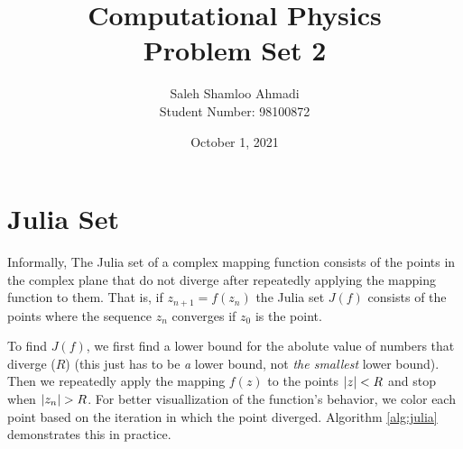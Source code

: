 \documentclass[12pt,a4paper]{article}
\title{Computational Physics\\Problem Set 2}
\author{Saleh Shamloo Ahmadi\\Student Number: 98100872}
\date{October 1, 2021}
\begin{document}
	\maketitle
    \section{Julia Set}
    Informally, The Julia set of a complex mapping function consists of the points in the complex plane that
    do not diverge after repeatedly applying the mapping function to them. That is, if $z_{n + 1} = f(z_n)$ the
    Julia set $J(f)$ consists of the points where the sequence $z_n$ converges if $z_0$ is the point.

    To find $J(f)$, we first find a lower bound for the abolute value of numbers that diverge ($R$)
    (this just has to be \emph{a} lower bound, not \emph{the smallest} lower bound). Then we repeatedly apply
    the mapping $f(z)$ to the points $\abs{z} < R$ and stop when $\abs{z_n} > R$. For better visuallization of
    the function's behavior, we color each point based on the iteration in which the point diverged.
    Algorithm \ref{alg:julia} demonstrates this in practice.
\end{document}
